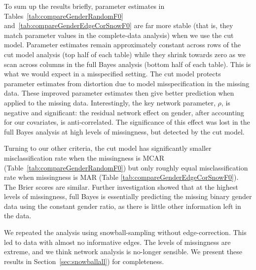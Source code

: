 \documentclass{article}
\begin{document}
To sum up the results briefly, parameter estimates in Tables~\ref{tab:compareGenderRandomF0} and~\ref{tab:compareGenderEdgeCorSnowF0} are far more stable
(that is, they match parameter values in the complete-data analysis) when we use the cut model. Parameter estimates remain approximately constant across rows of the cut model analysis (top half of each table) while they shrink towards zero as we scan across columns in the full Bayes analysis (bottom half of each table). This is what we would expect in a misspecified setting. The cut model protects parameter estimates from distortion due to model misspecification in the missing data. These improved parameter estimates then give better prediction when applied to the missing data.
Interestingly, the key network parameter, $\rho$, is negative and significant: the residual network effect on gender, after accounting for our covariates, is anti-correlated. The significance of this effect was lost in the full Bayes analysis at high levels of missingness, but detected by the cut model. 

Turning to our other criteria, the cut model has significantly smaller misclassification rate when the missingness is MCAR (Table~\ref{tab:compareGenderRandomF0}) 
but only roughly equal misclassification rate when
missingness is MAR (Table \ref{tab:compareGenderEdgeCorSnowF0}). The Brier scores are similar. Further investigation showed that at the highest
levels of missingness, full Bayes is essentially predicting the missing binary gender data using the constant gender ratio, as there is little other information left in the data. 

We repeated the analysis using snowball-sampling without edge-correction. This led to data with almost no informative edges. The levels of missingness are extreme, and we think network analysis is no-longer sensible. We present these results in Section~\ref{sec:snowballall}) for completeness. 
\end{document}
